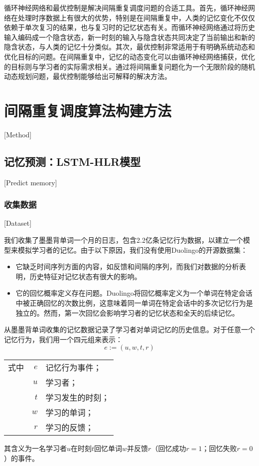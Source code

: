 循环神经网络和最优控制是解决间隔重复调度问题的合适工具。首先，循环神经网络在处理时序数据上有很大的优势，特别是在间隔重复中，人类的记忆变化不仅仅依赖于单次复习的结果，也与复习时的记忆状态有关。而循环神经网络通过将历史输入编码成一个隐含状态，新一时刻的输入与隐含状态共同决定了当前输出和新的隐含状态，与人类的记忆十分类似。其次，最优控制非常适用于有明确系统动态和优化目标的问题。在间隔重复中，记忆的动态变化可以由循环神经网络捕获，优化的目标则与学习者的实际需求相关。通过将间隔重复问题化为一个无限阶段的随机动态规划问题，最优控制能够给出可解释的解决方法。

\chapter{间隔重复调度算法构建方法}[Method]

\section{记忆预测：LSTM-HLR模型}[Predict memory]

\subsection{收集数据}[Dataset]

我们收集了墨墨背单词一个月的日志，包含2.2亿条记忆行为数据，以建立一个模型来模拟学习者的记忆。由于以下原因，我们没有使用Duolingo的开源数据集：

\begin{itemize}
    \item 它缺乏时间序列方面的内容，如反馈和间隔的序列，而我们对数据的分析表明，历史特征对记忆状态有很大的影响。
    \item 它的回忆概率定义存在问题。Duolingo将回忆概率定义为一个单词在特定会话中被正确回忆的次数比例，这意味着同一单词在特定会话中的多次记忆行为是独立的。然而，第一次回忆会影响学习者的记忆状态和全天的后续记忆。
\end{itemize}

从墨墨背单词收集的记忆数据记录了学习者对单词记忆的历史信息。对于任意一个记忆行为，我们用一个四元组来表示：
\begin{equation}
e :=(u, w, t, r)
\end{equation}
\begin{tabularx}{\textwidth}{@{}l@{\quad}r@{———}X@{}}
    式中& $e$ &记忆行为事件；\\
    &  $u$ &学习者；\\
    &  $t$ &学习发生的时刻；\\
    &  $w$ &学习的单词；\\
    &  $r$ &学习的反馈；
\end{tabularx}\vspace{3.15bp}
其含义为一名学习者$u$在时刻$t$回忆单词$w$并反馈$r$（回忆成功$r=1$；回忆失败$r=0$）的事件。

